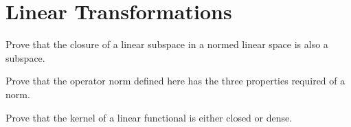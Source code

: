 \section{Linear Transformations}
\begin{problem}
Prove that the closure of a linear subspace in a normed linear space is also a subspace.
\end{problem}

\begin{problem}
Prove that the operator norm defined here has the three properties required of a norm.
\end{problem}

\begin{problem}
Prove that the kernel of a linear functional is either closed or dense.
\end{problem}